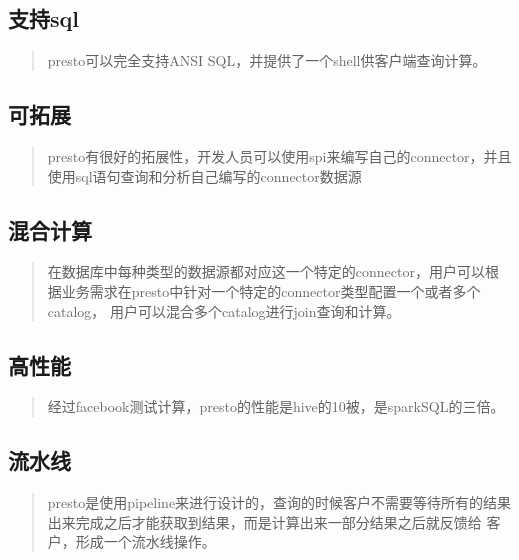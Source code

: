 \documentclass[letterpaper,10pt,english]{sphinxmanual}
\begin{document}
\subsection{支持sql}
\label{\detokenize{overview/feature:sql}}\begin{quote}

presto可以完全支持ANSI SQL，并提供了一个shell供客户端查询计算。
\end{quote}


\subsection{可拓展}
\label{\detokenize{overview/feature:id2}}\begin{quote}

presto有很好的拓展性，开发人员可以使用spi来编写自己的connector，并且使用sql语句查询和分析自己编写的connector数据源
\end{quote}


\subsection{混合计算}
\label{\detokenize{overview/feature:id3}}\begin{quote}

在数据库中每种类型的数据源都对应这一个特定的connector，用户可以根据业务需求在presto中针对一个特定的connector类型配置一个或者多个catalog，
用户可以混合多个catalog进行join查询和计算。
\end{quote}


\subsection{高性能}
\label{\detokenize{overview/feature:id4}}\begin{quote}

经过facebook测试计算，presto的性能是hive的10被，是sparkSQL的三倍。
\end{quote}


\subsection{流水线}
\label{\detokenize{overview/feature:id5}}\begin{quote}

presto是使用pipeline来进行设计的，查询的时候客户不需要等待所有的结果出来完成之后才能获取到结果，而是计算出来一部分结果之后就反馈给
客户，形成一个流水线操作。
\end{quote}
\end{document}
